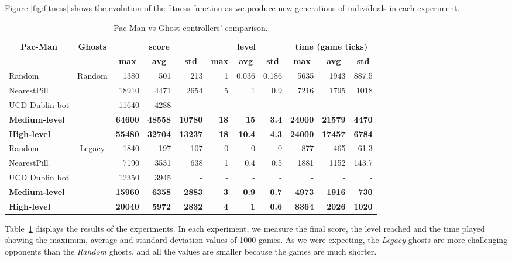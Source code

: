 \documentclass{llncs}
\newcommand{\paco}{Pac-Man }
\begin{document}
Figure \ref{fig:fitness} shows the evolution of the fitness function as we produce new generations of individuals in each experiment.
\begin{table}[]
\centering
\caption{\paco vs Ghost controllers' comparison.}
\label{table:single_obj}
\begin{tabular}{|l|c|r|r|r|r|r|r|r|r|r|}
\hline
\multicolumn{1}{|c|}{\multirow{2}{*}{\textbf{\paco}}} & \multirow{2}{*}{\textbf{Ghosts}} & \multicolumn{3}{c|}{\textbf{score}} & \multicolumn{3}{c|}{\textbf{level}} & \multicolumn{3}{c|}{\textbf{time (game ticks)}} \\ \cline{3-11} 
\multicolumn{1}{|c|}{} &  & \multicolumn{1}{c|}{\textbf{max}} & \multicolumn{1}{c|}{\textbf{avg}} & \multicolumn{1}{c|}{\textbf{std}} & \multicolumn{1}{c|}{\textbf{max}} & \multicolumn{1}{c|}{\textbf{avg}} & \multicolumn{1}{c|}{\textbf{std}} & \multicolumn{1}{c|}{\textbf{max}} & \multicolumn{1}{c|}{\textbf{avg}} & \multicolumn{1}{c|}{\textbf{std}} \\ \hline
Random &  \multirow{5}{*}{Random} & 1380 & 501 & 213 & 1 & 0.036 & 0.186 & 5635 & 1943 & 887.5 \\ \cline{1-1} \cline{3-11} 
NearestPill &  & 18910 & 4471 & 2654 & 5 & 1 & 0.9 & 7216 & 1795 & 1018 \\ \cline{1-1} \cline{3-11} 
UCD Dublin bot\cite{galvan2010evolving} &  & 11640 & 4288 & - & - & - & - & - & - & - \\ \cline{1-1} \cline{3-11} 
\textbf{Medium-level} &  & \textbf{64600} & \textbf{48558} & \textbf{10780} & \textbf{18} & \textbf{15} & \textbf{3.4} & \textbf{24000} & \textbf{21579} & \textbf{4470} \\ \cline{1-1} \cline{3-11} 
\textbf{High-level} &  & \textbf{55480} & \textbf{32704} & \textbf{13237} & \textbf{18} & \textbf{10.4} & \textbf{4.3} & \textbf{24000} & \textbf{17457} & \textbf{6784} \\ \hline
Random & \multirow{5}{*}{Legacy} & 1840 & 197 & 107 & 0 & 0 & 0 & 877 & 465 & 61.3 \\ \cline{1-1} \cline{3-11} 
NearestPill &  & 7190 & 3531 & 638 & 1 & 0.4 & 0.5 & 1881 & 1152 & 143.7 \\ \cline{1-1} \cline{3-11} 
UCD Dublin bot\cite{galvan2010evolving} &  & 12350 & 3945 & - & - & - & - & - & - & - \\ \cline{1-1} \cline{3-11} 
\textbf{Medium-level} &  & \textbf{15960} & \textbf{6358} & \textbf{2883} & \textbf{3} & \textbf{0.9} & \textbf{0.7} & \textbf{4973} & \textbf{1916} & \textbf{730} \\ \cline{1-1} \cline{3-11} 
\textbf{High-level} &  & \textbf{20040} & \textbf{5972} & \textbf{2832} & \textbf{4} & \textbf{1} & \textbf{0.6} & \textbf{8364} & \textbf{2026} & \textbf{1020} \\ \hline
\end{tabular}
\end{table}
Table~\ref{table:single_obj} displays the results of the experiments. In each experiment, we measure the final score, the level reached and the time played showing the maximum, average and standard deviation values of 1000 games. As we were expecting, the \emph{Legacy} ghosts are more challenging opponents than the \emph{Random} ghosts, and all the values are smaller because the games are much shorter. 
\end{document}
